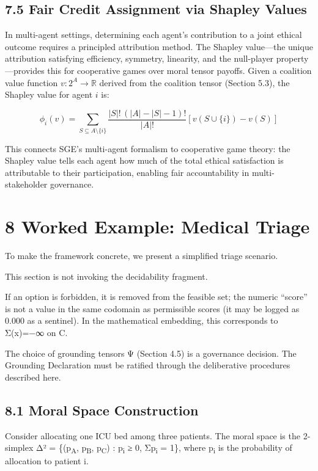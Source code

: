 \documentclass[12pt]{article}
\theoremstyle{plain}
\theoremstyle{definition}
\theoremstyle{remark}
\begin{document}
\subsection{7.5 Fair Credit Assignment via Shapley Values}\label{shapley-values}

In multi-agent settings, determining each agent's contribution to a joint ethical outcome requires a principled attribution method. The Shapley value---the unique attribution satisfying efficiency, symmetry, linearity, and the null-player property---provides this for cooperative games over moral tensor payoffs. Given a coalition value function $v: 2^A \rightarrow \mathbb{R}$ derived from the coalition tensor (Section 5.3), the Shapley value for agent $i$ is:

\[
\phi_i(v) = \sum_{S \subseteq A \setminus \{i\}} \frac{|S|! \, (|A| - |S| - 1)!}{|A|!} \left[ v(S \cup \{i\}) - v(S) \right]
\]

This connects SGE's multi-agent formalism to cooperative game theory: the Shapley value tells each agent how much of the total ethical satisfaction is attributable to their participation, enabling fair accountability in multi-stakeholder governance.

\section{8 Worked Example: Medical
Triage}\label{worked-example-medical-triage}

To make the framework concrete, we present a simplified triage scenario.

This section is not invoking the decidability fragment.

If an option is forbidden, it is removed from the feasible set; the
numeric ``score'' is not a value in the same codomain as permissible
scores (it may be logged as 0.000 as a sentinel). In the mathematical
embedding, this corresponds to Σ(x)=−∞ on C.

The choice of grounding tensors Ψ (Section 4.5) is a governance
decision. The Grounding Declaration must be ratified through the
deliberative procedures described here.

\subsection{8.1 Moral Space
Construction}\label{moral-space-construction}

Consider allocating one ICU bed among three patients. The moral space is
the 2-simplex Δ² = \{(p\textsubscript{A}, p\textsubscript{B},
p\textsubscript{C}) : p\textsubscript{i} ≥ 0, Σp\textsubscript{i} = 1\},
where p\textsubscript{i} is the probability of allocation to patient i.
\end{document}
